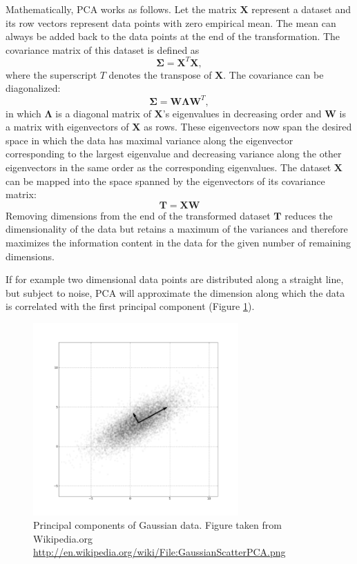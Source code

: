 \documentclass[english, a4paper, 12pt, titlepage, draft]{article}
\newcommand{\vect}[1]{\mathbf{#1}}
\begin{document}
Mathematically, PCA works as follows.
Let the matrix $\vect{X}$ represent a dataset and its row vectors represent data points with zero empirical mean.
The mean can always be added back to the data points at the end of the transformation.
The covariance matrix of this dataset is defined as
\begin{equation}
    \vect{\Sigma} = \vect{X}^{T} \vect{X},
\end{equation}
where the superscript $T$ denotes the transpose of $\vect{X}$.
The covariance can be diagonalized:
\begin{equation}
    \vect{\Sigma} = \vect{W} \vect{\Lambda} \vect{W}^{T},
\end{equation}
in which $\vect{\Lambda}$ is a diagonal matrix of $\vect{X}$'s eigenvalues in decreasing order and $\vect{W}$ is a matrix with eigenvectors of $\vect{X}$ as rows.
These eigenvectors now span the desired space in which the data has maximal variance along the eigenvector corresponding to the largest eigenvalue and decreasing variance along the other eigenvectors in the same order as the corresponding eigenvalues.
The dataset $\vect{X}$ can be mapped into the space spanned by the eigenvectors of its covariance matrix:
\begin{equation}
    \vect{T} = \vect{X} \vect{W}
\end{equation}
Removing dimensions from the end of the transformed dataset $\vect{T}$ reduces the dimensionality of the data but retains a maximum of the variances and therefore maximizes the information content in the data for the given number of remaining dimensions.

If for example two dimensional data points are distributed along a straight line, but subject to noise, PCA will approximate the dimension along which the data is correlated with the first principal component (Figure \ref{fig:PCA}).

\begin{figure}
    \centering
    \includegraphics[width=0.7\textwidth]{figures/GaussianScatterPCA.png}
    \caption{Principal components of Gaussian data. Figure taken from Wikipedia.org \url{http://en.wikipedia.org/wiki/File:GaussianScatterPCA.png}}
    \label{fig:PCA}
\end{figure}         
\end{document}
